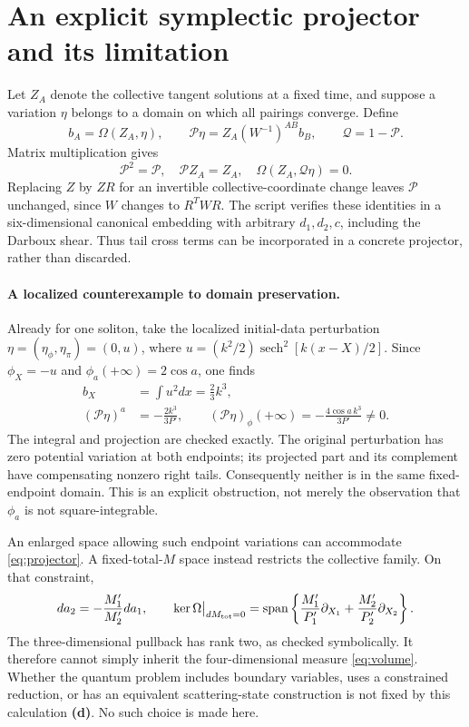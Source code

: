 \documentclass[11pt]{article}
\newcommand{\Ld}{\textbf{(d)}}
\begin{document}
\section{An explicit symplectic projector and its limitation}
Let $Z_A$ denote the collective tangent solutions at a fixed time, and suppose
a variation $\eta$ belongs to a domain on which all pairings converge. Define
\begin{equation}\label{eq:projector}
 b_A=\Omega(Z_A,\eta),\qquad
 \mathcal P\eta=Z_A(W^{-1})^{AB}b_B,\qquad
 \mathcal Q=1-\mathcal P.
\end{equation}
Matrix multiplication gives
\begin{equation}
 \mathcal P^2=\mathcal P,\quad \mathcal PZ_A=Z_A,\quad
 \Omega(Z_A,\mathcal Q\eta)=0.
\end{equation}
Replacing $Z$ by $ZR$ for an invertible collective-coordinate change leaves
$\mathcal P$ unchanged, since $W$ changes to $R^TWR$. The script verifies
these identities in a six-dimensional canonical embedding with arbitrary
$d_1,d_2,c$, including the Darboux shear. Thus tail cross terms can be
incorporated in a concrete projector, rather than discarded.

\paragraph{A localized counterexample to domain preservation.}
Already for one soliton, take the localized initial-data perturbation
$\eta=(\eta_\phi,\eta_\pi)=(0,u)$, where
$u=(k^2/2)\operatorname{sech}^2[k(x-X)/2]$.
Since $\phi_X=-u$ and $\phi_a(+\infty)=2\cos a$, one finds
\begin{align}
 b_X&=\int u^2dx=\frac23 k^3,\\
 (\mathcal P\eta)^a&=-\frac{2k^3}{3P'},\qquad
 (\mathcal P\eta)_\phi(+\infty)
 =-\frac{4\cos a\,k^3}{3P'}\ne0.
\end{align}
The integral and projection are checked exactly. The original perturbation
has zero potential variation at both endpoints; its projected part and its
complement have compensating nonzero right tails. Consequently neither is
in the same fixed-endpoint domain. This is an explicit obstruction, not
merely the observation that $\phi_a$ is not square-integrable.

An enlarged space allowing such endpoint variations can accommodate
\eqref{eq:projector}. A fixed-total-$M$ space instead restricts the collective
family. On that constraint,
\begin{equation}
 da_2=-\frac{M'_1}{M'_2}da_1,\qquad
 \ker\Omega\big|_{dM_{\rm tot}=0}
 =\operatorname{span}\left\{
 \frac{M'_1}{P'_1}\partial_{X_1}
 +\frac{M'_2}{P'_2}\partial_{X_2}\right\}.
\end{equation}
The three-dimensional pullback has rank two, as checked symbolically.
It therefore cannot simply inherit the four-dimensional measure
\eqref{eq:volume}. Whether the quantum problem includes boundary variables,
uses a constrained reduction, or has an equivalent scattering-state
construction is not fixed by this calculation \Ld. No such choice is made
here.
\end{document}
